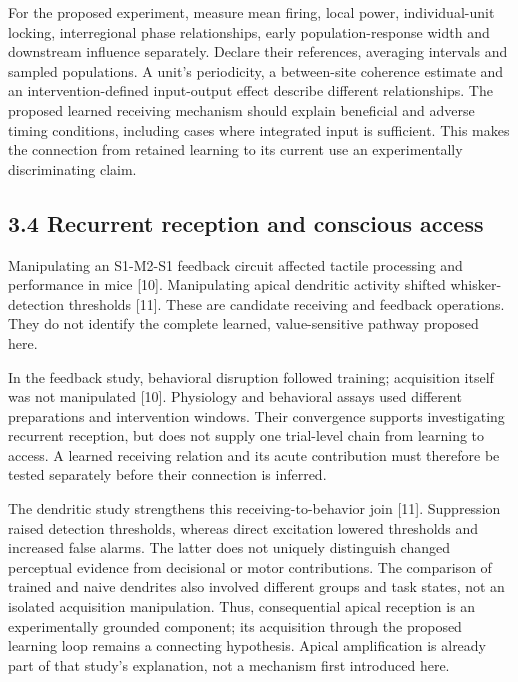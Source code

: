 \documentclass[
  american,
  11pt,
  letterpaper,
]{article}
\begin{document}
For the proposed experiment, measure mean firing, local power, individual-unit locking, interregional phase relationships, early population-response width and downstream influence separately. Declare their references, averaging intervals and sampled populations. A unit's periodicity, a between-site coherence estimate and an intervention-defined input-output effect describe different relationships. The proposed learned receiving mechanism should explain beneficial and adverse timing conditions, including cases where integrated input is sufficient. This makes the connection from retained learning to its current use an experimentally discriminating claim.

\subsection{3.4 Recurrent reception and conscious access}\label{recurrent-reception-and-conscious-access}

Manipulating an S1-M2-S1 feedback circuit affected tactile processing and performance in mice {[}10{]}. Manipulating apical dendritic activity shifted whisker-detection thresholds {[}11{]}. These are candidate receiving and feedback operations. They do not identify the complete learned, value-sensitive pathway proposed here.

In the feedback study, behavioral disruption followed training; acquisition itself was not manipulated {[}10{]}. Physiology and behavioral assays used different preparations and intervention windows. Their convergence supports investigating recurrent reception, but does not supply one trial-level chain from learning to access. A learned receiving relation and its acute contribution must therefore be tested separately before their connection is inferred.

The dendritic study strengthens this receiving-to-behavior join {[}11{]}. Suppression raised detection thresholds, whereas direct excitation lowered thresholds and increased false alarms. The latter does not uniquely distinguish changed perceptual evidence from decisional or motor contributions. The comparison of trained and naive dendrites also involved different groups and task states, not an isolated acquisition manipulation. Thus, consequential apical reception is an experimentally grounded component; its acquisition through the proposed learning loop remains a connecting hypothesis. Apical amplification is already part of that study's explanation, not a mechanism first introduced here.
\end{document}
